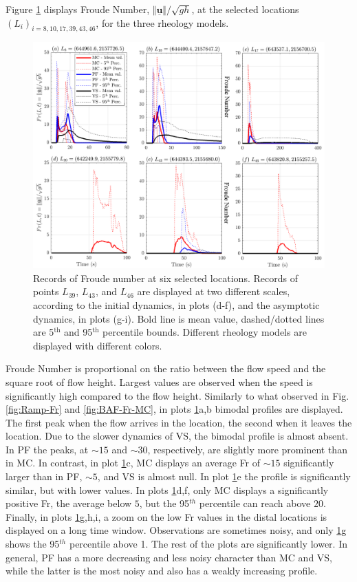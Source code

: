 \documentclass{article}
\begin{document}
Figure \ref{fig:Colima-Fr1} displays Froude Number, $\Vert \underline{\mathbf{u}} \Vert/\sqrt{gh}$, at the selected locations $(L_i)_{i=8,10,17,39,43,46}$, for the three rheology models.
\begin{figure}[H]
         \centering
        \includegraphics[width=1\textwidth]{BAF_VolcanDeColima/LocalMeasurments/Froude12.png}
        \caption{Records of Froude number at six selected locations. Records of points $L_{39}$, $L_{43}$, and $L_{46}$ are displayed at two different scales, according to the initial dynamics, in plots (d-f), and the asymptotic dynamics, in plots (g-i). Bold line is mean value, dashed/dotted lines are 5$^{\mathrm{th}}$ and 95$^{\mathrm{th}}$ percentile bounds. Different rheology models are displayed with different colors.}
        \label{fig:Colima-Fr1}
\end{figure}
Froude Number is proportional on the ratio between the flow speed and the square root of flow height. Largest values are observed when the speed is significantly high compared to the flow height. Similarly to what observed in Fig. \ref{fig:Ramp-Fr} and \ref{fig:BAF-Fr-MC}, in plots \ref{fig:Colima-Fr1}a,b bimodal profiles are displayed. The first peak when the flow arrives in the location, the second when it leaves the location. Due to the slower dynamics of VS, the bimodal profile is almost absent. In PF the peaks, at $\sim 15$ and $\sim 30$, respectively, are slightly more prominent than in MC. In contrast, in plot \ref{fig:Colima-Fr1}c, MC displays an average Fr of $\sim 15$ significantly larger than in PF, $\sim 5$, and VS is almost null. In plot \ref{fig:Colima-Fr1}e the profile is significantly similar, but with lower values. In plots \ref{fig:Colima-Fr1}d,f, only MC displays a significantly positive Fr, the average below $5$, but the 95$^{th}$ percentile can reach above $20$. Finally, in plots \ref{fig:Colima-Fr1}g,h,i, a zoom on the low Fr values in the distal locations is displayed on a long time window. Observations are sometimes noisy, and only \ref{fig:Colima-Fr1}g shows the 95$^{th}$ percentile above 1. The rest of the plots are significantly lower. In general, PF has a more decreasing and less noisy character than MC and VS, while the latter is the most noisy and also has a weakly increasing profile.
\end{document}
